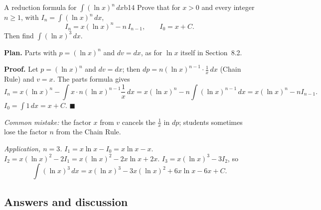\documentclass[11pt]{article}
\begin{document}
\begin{exmp}{A reduction formula for $\int(\ln x)^n\,dx$}{b14}
Prove that for $x>0$ and every integer $n\ge1$, with $I_n=\int(\ln x)^n\,dx$,
\[I_n=x(\ln x)^n-n\,I_{n-1},\qquad I_0=x+C .\]
Then find $\displaystyle\int(\ln x)^3\,dx$.

\textbf{Plan.} Parts with $p=(\ln x)^n$ and $dv=dx$, as for $\ln x$ itself in Section~8.2.

\textbf{Proof.} Let $p=(\ln x)^n$ and $dv=dx$; then $dp=n(\ln x)^{n-1}\cdot\frac1x\,dx$ (Chain Rule) and $v=x$. The parts formula gives
\[I_n=x(\ln x)^n-\int x\cdot n(\ln x)^{n-1}\frac1x\,dx=x(\ln x)^n-n\int(\ln x)^{n-1}\,dx=x(\ln x)^n-nI_{n-1}.\]
$I_0=\int1\,dx=x+C$. $\blacksquare$

\emph{Common mistake:} the factor $x$ from $v$ cancels the $\frac1x$ in $dp$; students sometimes lose the factor $n$ from the Chain Rule.

\emph{Application, $n=3$.} $I_1=x\ln x-I_0=x\ln x-x$. $I_2=x(\ln x)^2-2I_1=x(\ln x)^2-2x\ln x+2x$. $I_3=x(\ln x)^3-3I_2$, so
\[\int(\ln x)^3\,dx=x(\ln x)^3-3x(\ln x)^2+6x\ln x-6x+C .\]
\end{exmp}

\subsection*{Answers and discussion}
\end{document}
